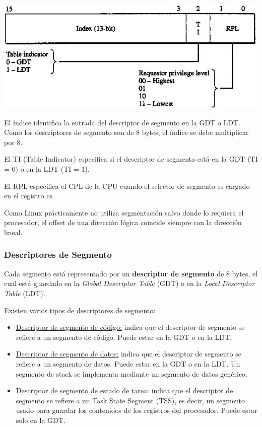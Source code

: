 \begin{center}
\includegraphics[scale=0.5]{./Graficos/selector_segmento.png} 
\end{center}

El \'indice identifica la entrada del descriptor de segmento en la GDT o LDT. Como los descriptores de segmento son de 8 bytes, el \'indice se
debe multiplicar por 8.

El TI (Table Indicator) especifica si el descriptor de segmento est\'a en la GDT (TI = 0) o en la LDT (TI = 1).

El RPL especifica el CPL de la CPU cuando el selector de segmento es cargado en el registro cs.

Como Linux pr\'acticamente no utiliza segmentaci\'on salvo donde lo requiera el procesador, el offset de una direcci\'on l\'ogica coincide
siempre con la direcci\'on lineal.

\subsubsection{Descriptores de Segmento}

Cada segmento est\'a representado por un \textbf{descriptor de segmento} de 8 bytes, el cual est\'a guardado en la \textit{Global Descriptor Table}
(GDT) o en la \textit{Local Descriptor Table} (LDT).

Existen varios tipos de descriptores de segmento:

\begin{itemize}
 \item \underline{Descriptor de segmento de c\'odigo:} indica que el descriptor de segmento se refiere a un segmento de c\'odigo. Puede
 estar en la GDT o en la LDT.
 \item \underline{Descriptor de segmento de datos:} indica que el descriptor de segmento se refiere a un segmento de datos. Puede estar en la 
 GDT o en la LDT. Un segmento de stack se implementa mediante un segmento de datos gen\'erico.
 \item \underline{Descriptor de segmento de estado de tarea:} indica que el descriptor de segmento se refiere a un Task State Segment (TSS), es decir, un
 segmento usado para guardar los contenidos de los registros del procesador. Puede estar solo en la GDT.
\end{itemize}

